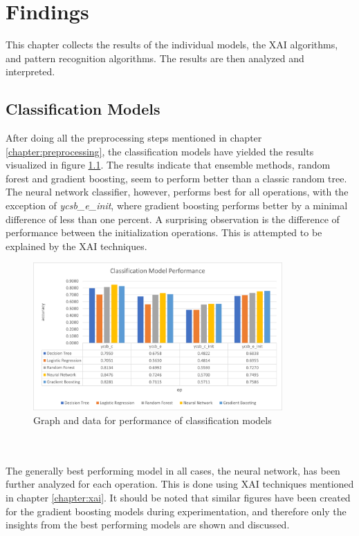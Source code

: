 \chapter{Findings}\label{chapter:findings}
This chapter collects the results of the individual models, the \ac{XAI} algorithms, and pattern recognition algorithms. The results are then analyzed and interpreted.

\section{Classification Models}
After doing all the preprocessing steps mentioned in chapter \ref{chapter:preprocessing}, the classification models have yielded the results visualized in figure \ref{fig:classification_performance}. The results indicate that ensemble methods, random forest and gradient boosting, seem to perform better than a classic random tree. The neural network classifier, however, performs best for all operations, with the exception of \textit{ycsb\_e\_init}, where gradient boosting performs better by a minimal difference of less than one percent. A surprising observation is the difference of performance between the initialization operations. This is attempted to be explained by the XAI techniques.
\begin{figure}[h]
      \centering
      \includegraphics[width=0.85\textwidth]{images/classification_performance.png}
      \caption{Graph and data for performance of classification models}
      \label{fig:classification_performance}
  \end{figure}
\\\\
The generally best performing model in all cases, the neural network, has been further analyzed for each operation. This is done using \ac{XAI} techniques mentioned in chapter \ref{chapter:xai}. It should be noted that similar figures have been created for the gradient boosting models during experimentation, and therefore only the insights from the best performing models are shown and discussed. \\

